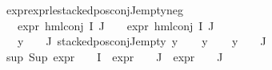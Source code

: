 \begin{isabellebody}
\isamarkupfalse%
\ expr{\isacharunderscore}{\kern0pt}{}{\isacharunderscore}{\kern0pt}expr{\isacharunderscore}{\kern0pt}{}{\isacharunderscore}{\kern0pt}le{\isacharunderscore}{\kern0pt}{}{\isacharunderscore}{\kern0pt}stacked{\isacharunderscore}{\kern0pt}pos{\isacharunderscore}{\kern0pt}conj{\isacharunderscore}{\kern0pt}J{\isacharunderscore}{\kern0pt}empty{\isacharunderscore}{\kern0pt}neg{\isacharcolon}{\kern0pt}\isanewline
\ \ \ {\isachardoublequoteopen}expr{\isacharunderscore}{\kern0pt}{}\ {\isacharparenleft}{\kern0pt}hml{\isacharunderscore}{\kern0pt}conj\ I\ J\ {\isasymPhi}{\isacharparenright}{\kern0pt}\ {\isasymle}\ {}{\isachardoublequoteclose}\ {\isachardoublequoteopen}expr{\isacharunderscore}{\kern0pt}{}\ {\isacharparenleft}{\kern0pt}hml{\isacharunderscore}{\kern0pt}conj\ I\ J\ {\isasymPhi}{\isacharparenright}{\kern0pt}\ {\isasymle}\ {}{\isachardoublequoteclose}\isanewline
\ \ \ {\isachardoublequoteopen}{\isacharparenleft}{\kern0pt}{\isasymforall}y\ {\isasymin}\ {\isacharparenleft}{\kern0pt}{\isasymPhi}\ {\isacharbackquote}{\kern0pt}\ J{\isacharparenright}{\kern0pt}{\isachardot}{\kern0pt}\ stacked{\isacharunderscore}{\kern0pt}pos{\isacharunderscore}{\kern0pt}conj{\isacharunderscore}{\kern0pt}J{\isacharunderscore}{\kern0pt}empty\ y{\isacharparenright}{\kern0pt}{\isachardoublequoteclose}\isanewline
%
\isadelimproof
%
\endisadelimproof
%
\isatagproof
{}\isamarkupfalse%
\isanewline
\ \ \isamarkupfalse%
\ y\isanewline
\ \ \isamarkupfalse%
\ {\isachardoublequoteopen}y\ {\isasymin}\ {\isasymPhi}\ {\isacharbackquote}{\kern0pt}\ J{\isachardoublequoteclose}\isanewline
\ \ \isamarkupfalse%
\ sup{\isacharcolon}{\kern0pt}\ {\isachardoublequoteopen}{\isacharparenleft}{\kern0pt}Sup\ {\isacharparenleft}{\kern0pt}{\isacharparenleft}{\kern0pt}expr{\isacharunderscore}{\kern0pt}{}\ {\isasymcirc}\ {\isasymPhi}{\isacharparenright}{\kern0pt}\ {\isacharbackquote}{\kern0pt}\ I\ {\isasymunion}\ {\isacharparenleft}{\kern0pt}expr{\isacharunderscore}{\kern0pt}{}\ {\isasymcirc}\ {\isasymPhi}{\isacharparenright}{\kern0pt}\ {\isacharbackquote}{\kern0pt}\ J\ {\isasymunion}\ {\isacharparenleft}{\kern0pt}expr{\isacharunderscore}{\kern0pt}{}\ {\isasymcirc}\ {\isasymPhi}{\isacharparenright}{\kern0pt}\ {\isacharbackquote}{\kern0pt}\ J{\isacharparenright}{\kern0pt}{\isacharparenright}{\kern0pt}\ {\isasymle}\ {}{\isachardoublequoteclose}\isanewline

\end{isabellebody}
